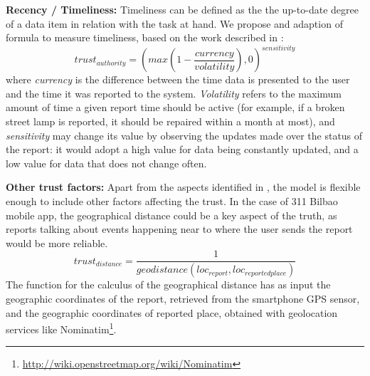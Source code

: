 \textbf{Recency / Timeliness:} Timeliness can be defined as the the up-to-date degree of a data item in relation with the task at hand. We propose and adaption of \cite{Hartig09usingweb} formula to measure timeliness, based on the work described in \cite{Ballou:1998:MIM:291329.291335}:
%
\begin{equation}
    trust_{authority} = (max(1-\frac{currency}{volatility}), 0)^{sensitivity}
\end{equation}
%
where \emph{currency} is the difference between the time data is presented to the user and the time it was reported to the system. \emph{Volatility} refers to the maximum amount of time a given report time should be active (for example, if a broken street lamp is reported, it should be repaired within a month at most), and \emph{sensitivity} may change its value by observing the updates made over the status of the report: it would adopt a high value for data being constantly updated, and a low value for data that does not change often.

\textbf{Other trust factors:} Apart from the aspects identified in \cite{gil2007towards}, the model is flexible enough to include other factors affecting the trust. In the case of 311 Bilbao mobile app, the geographical distance could be a key aspect of the truth, as reports talking about events happening near to where the user sends the report would be more reliable.
%
\begin{equation}
trust_{distance} = \frac{1}{geodistance(loc_{report}, loc_{reportedplace})}
\end{equation}
%
The function for the calculus of the geographical distance has as input the geographic coordinates of the report, retrieved from the smartphone GPS sensor, and the geographic coordinates of reported place, obtained with geolocation services like Nominatim\footnote{\url{http://wiki.openstreetmap.org/wiki/Nominatim}}.
